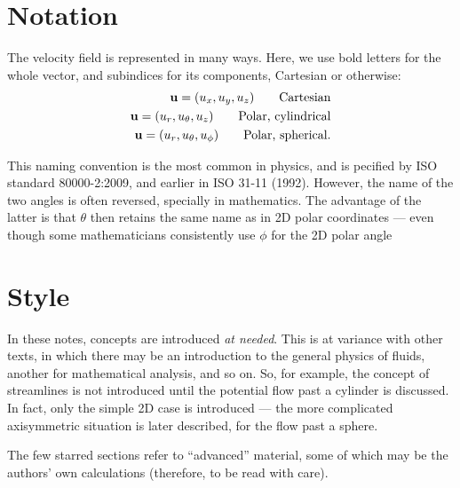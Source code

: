\section{Notation}
\label{sec:notation}

The velocity field is represented in many ways. Here,
we use bold letters for the whole vector, and subindices
for its components, Cartesian or otherwise:
\begin{align*}
  \mathbf{u} = ( u_x, u_y, u_z) \qquad \text{Cartesian} \\
  \mathbf{u} = ( u_r, u_\theta, u_z) \qquad \text{Polar, cylindrical} \\
  \mathbf{u} = ( u_r, u_\theta, u_\phi) \qquad \text{Polar, spherical} .
\end{align*}



  This naming convention is the most common in physics, and is
  pecified by ISO standard 80000-2:2009, and earlier in ISO 31-11
  (1992). However, the name of the two angles is often reversed,
  specially in mathematics. The advantage of the latter is that
  $\theta$ then retains the same name as in 2D polar coordinates ---
  even though some mathematicians consistently use $\phi$ for the 2D
  polar angle

\section{Style}

In these notes, concepts are introduced \emph{at needed}. This is at
variance with other texts, in which there may be an introduction to
the general physics of fluids, another for mathematical analysis, and
so on. So, for example, the concept of streamlines is not introduced
until the potential flow past a cylinder is discussed. In fact, only
the simple 2D case is introduced --- the more complicated axisymmetric
situation is later described, for the flow past a sphere.

The few starred sections refer to ``advanced'' material, some of which
may be the authors' own calculations (therefore, to be read with
care).
